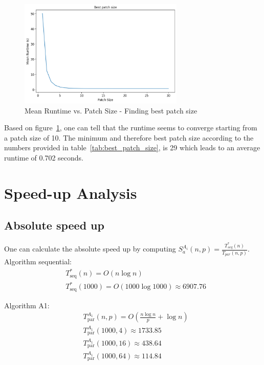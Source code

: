 \documentclass[a4paper,%
11pt,%
DIV12,
headsepline,%
headings=normal,
]{scrartcl}
\begin{document}
\begin{figure}[h!]
    \centering
    \includegraphics[width=0.7\textwidth]{template-2/best_patch_size.png}
    \caption{Mean Runtime vs. Patch Size - Finding best patch size}
    \label{fig:best_patch_size}
\end{figure}

Based on figure~\ref{fig:best_patch_size}, one can tell that the runtime seems to converge starting from a patch size of 10. The minimum and therefore best patch size according to the numbers provided in table~\ref{tab:best_patch_size}, is 29 which leads to an average runtime of 0.702 seconds. 

\section{Speed-up Analysis}

\subsection{Absolute speed up}

One can calculate the absolute speed up by computing $S_{a}^{A_i}(n, p) = \frac{T_{seq}^*(n)}{T_{par}(n, p)} $. \\

Algorithm sequential:
\begin{align*}
    &T_{\text{seq}}^*(n) = O(n \log n) \\
    &T^*_{\text{seq}}(1000) = O(1000 \log 1000) \approx 6907.76
\end{align*}

Algorithm A1:
\begin{align*}
    &T^{A_1}_{\text{par}}(n, p) = O\left(\frac{n \log n}{p} + \log n\right) \\
    &T^{A_1}_{\text{par}}(1000, 4) \approx 1733.85 \\
    &T^{A_1}_{\text{par}}(1000, 16) \approx 438.64 \\
    &T^{A_1}_{\text{par}}(1000, 64) \approx 114.84
\end{align*}
\end{document}
